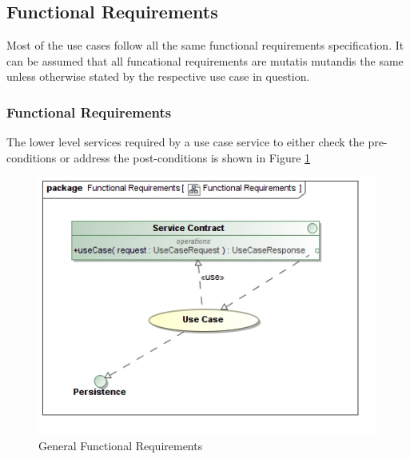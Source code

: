 \subsection{Functional Requirements}
Most of the use cases follow all the same functional requirements specification.
It can be assumed that all funcational requirements are mutatis mutandis the same
unless otherwise stated by the respective use case in question.

\subsubsection {Functional Requirements}
The lower level services required by a use case service to 
either check the pre-conditions or address the post-conditions is shown in
Figure \ref{fig:generalFuncationalRequirements}
\begin{figure}[H]
  \begin{center}
  \includegraphics[scale=0.38]{../Diagrams and Charts/Functional Requirements.jpg}
  \caption{General Functional Requirements}
  \label{fig:generalFuncationalRequirements}
  \end{center}
\end{figure}

